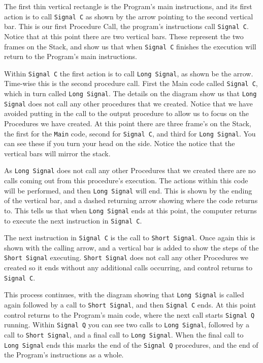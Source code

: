 The first thin vertical rectangle is the Program's main instructions, and its first action is to call \texttt{Signal C} as shown by the arrow pointing to the second vertical bar. This is our first Procedure Call, the program's instructions call \texttt{Signal C}. Notice that at this point there are two vertical bars. These represent the two frames on the Stack, and show us that when \texttt{Signal C} finishes the execution will return to the Program's main instructions.

Within \texttt{Signal C} the first action is to call \texttt{Long Signal}, as shown be the arrow. Time-wise this is the second procedure call. First the Main code called \texttt{Signal C}, which in turn called \texttt{Long Signal}. The details on the diagram show us that \texttt{Long Signal} does not call any other procedures that we created. Notice that we have avoided putting in the call to the output procedure to allow us to focus on the Procedures we have created. At this point there are three frame's on the Stack, the first for the \texttt{Main} code, second for \texttt{Signal C}, and third for \texttt{Long Signal}. You can see these if you turn your head on the side. Notice the notice that the vertical bars will mirror the stack.

As \texttt{Long Signal} does not call any other Procedures that we created there are no calls coming out from this procedure's execution. The actions within this code will be performed, and then \texttt{Long Signal} will end. This is shown by the ending of the vertical bar, and a dashed returning arrow showing where the code returns to. This tells us that when \texttt{Long Signal} ends at this point, the computer returns to execute the next instruction in \texttt{Signal C}.

The next instruction in \texttt{Signal C} is the call to \texttt{Short Signal}. Once again this is shown with the calling arrow, and a vertical bar is added to show the steps of the \texttt{Short Signal} executing. \texttt{Short Signal} does not call any other Procedures we created so it ends without any additional calls occurring, and control returns to \texttt{Signal C}.

This process continues, with the diagram showing that \texttt{Long Signal} is called again followed by a call to \texttt{Short Signal}, and then \texttt{Signal C} ends. At this point control returns to the Program's main code, where the next call starts \texttt{Signal Q} running. Within \texttt{Signal Q} you can see two calls to \texttt{Long Signal}, followed by a call to \texttt{Short Signal}, and a final call to \texttt{Long Signal}. When the final call to \texttt{Long Signal} ends this marks the end of the \texttt{Signal Q} procedures, and the end of the Program's instructions as a whole.

